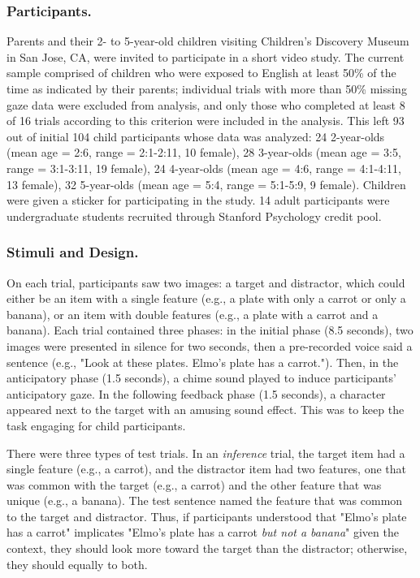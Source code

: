 \documentclass[10pt,letterpaper]{article}
\begin{document}
\subsubsection{Participants.}

Parents and their 2- to 5-year-old children visiting Children's Discovery Museum in San Jose, CA, were invited to participate in a short video study. The current sample comprised of children who were exposed to English at least 50\% of the time as indicated by their parents; individual trials with more than 50\% missing gaze data were excluded from analysis, and only those who completed at least 8 of 16 trials according to this criterion were included in the analysis. This left 93 out of initial 104 child participants whose data was analyzed: 24 2-year-olds (mean age = 2:6, range = 2:1-2:11, 10 female), 28 3-year-olds (mean age = 3:5, range = 3:1-3:11, 19 female), 24 4-year-olds (mean age = 4:6, range = 4:1-4:11, 13 female), 32 5-year-olds (mean age = 5:4, range = 5:1-5:9, 9 female). Children were given a sticker for participating in the study. 14 adult participants were undergraduate students recruited through Stanford Psychology credit pool.

\vspace{12pt}

\subsubsection{Stimuli and Design.}

On each trial, participants saw two images: a target and distractor, which could either be an item with a single feature (e.g., a plate with only a carrot or only a banana), or an item with double features (e.g., a plate with a carrot and a banana). Each trial contained three phases: in the initial phase (8.5 seconds), two images were presented in silence for two seconds, then a pre-recorded voice said a sentence (e.g., "Look at these plates. Elmo's plate has a carrot."). Then, in the anticipatory phase (1.5 seconds), a chime sound played to induce participants' anticipatory gaze. In the following feedback phase (1.5 seconds), a character appeared next to the target with an amusing sound effect. This was to keep the task engaging for child participants.

There were three types of test trials. In an \emph{inference} trial, the target item had a single feature (e.g., a carrot), and the distractor item had two features, one that was common with the target (e.g., a carrot) and the other feature that was unique (e.g., a banana). The test sentence named the feature that was common to the target and distractor. Thus, if participants understood that "Elmo's plate has a carrot" implicates "Elmo's plate has a carrot \emph{but not a banana}" given the context, they should look more toward the target than the distractor; otherwise, they should equally to both.
\end{document}
